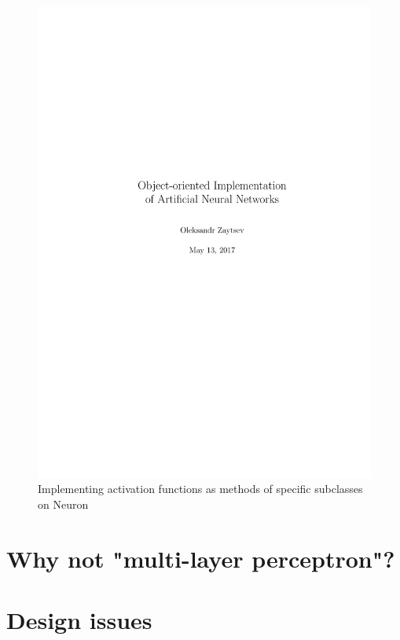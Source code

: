 \begin{figure}[H]
  \centering
  \includegraphics[width=\linewidth]{mlnn}
  \caption{Implementing activation functions as methods of specific subclasses on Neuron}
  \label{fig:mlnn}
\end{figure}

\section{Why not "multi-layer perceptron"?}


\section{Design issues}


% 
%      
% 
